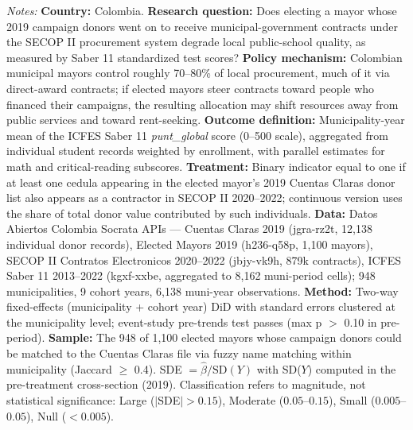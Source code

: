  \begin{tablenotes}
 \item \textit{Notes:}  \textbf{Country:} Colombia.  \textbf{Research question:} Does electing a mayor whose 2019 campaign donors went on to receive municipal-government contracts under the SECOP II procurement system degrade local public-school quality, as measured by Saber 11 standardized test scores?  \textbf{Policy mechanism:} Colombian municipal mayors control roughly 70--80\% of local procurement, much of it via direct-award contracts; if elected mayors steer contracts toward people who financed their campaigns, the resulting allocation may shift resources away from public services and toward rent-seeking.  \textbf{Outcome definition:} Municipality-year mean of the ICFES Saber 11 \textit{punt\_global} score (0--500 scale), aggregated from individual student records weighted by enrollment, with parallel estimates for math and critical-reading subscores.  \textbf{Treatment:} Binary indicator equal to one if at least one cedula appearing in the elected mayor's 2019 Cuentas Claras donor list also appears as a contractor in SECOP II 2020--2022; continuous version uses the share of total donor value contributed by such individuals.  \textbf{Data:} Datos Abiertos Colombia Socrata APIs --- Cuentas Claras 2019 (jgra-rz2t, 12{,}138 individual donor records), Elected Mayors 2019 (h236-q58p, 1{,}100 mayors), SECOP II Contratos Electronicos 2020--2022 (jbjy-vk9h, 879k contracts), ICFES Saber 11 2013--2022 (kgxf-xxbe, aggregated to 8{,}162 muni-period cells); 948 municipalities, 9 cohort years, 6{,}138 muni-year observations.  \textbf{Method:} Two-way fixed-effects (municipality + cohort year) DiD with standard errors clustered at the municipality level; event-study pre-trends test passes (max p $>$ 0.10 in pre-period).  \textbf{Sample:} The 948 of 1{,}100 elected mayors whose campaign donors could be matched to the Cuentas Claras file via fuzzy name matching within municipality (Jaccard $\geq$ 0.4).  SDE $= \hat{\beta} / \text{SD}(Y)$ with SD($Y$) computed in the pre-treatment cross-section (2019).  Classification refers to magnitude, not statistical significance: Large ($|$SDE$| > 0.15$), Moderate ($0.05$--$0.15$), Small ($0.005$--$0.05$), Null ($< 0.005$).
 \end{tablenotes}

